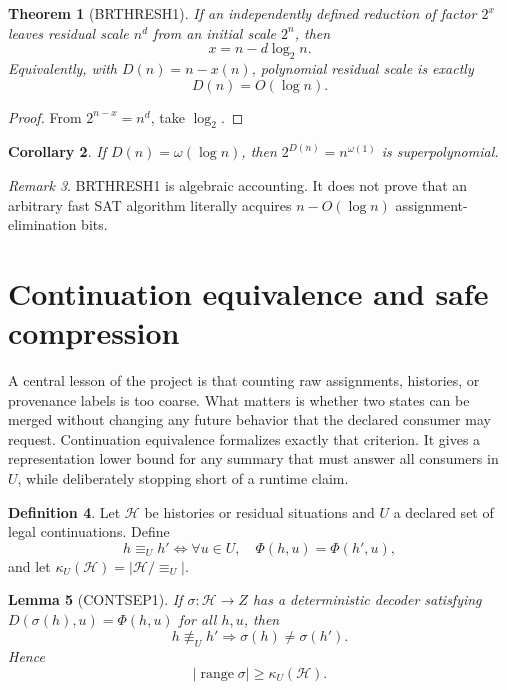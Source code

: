 \documentclass[11pt]{article}
\theoremstyle{plain}
\newtheorem{theorem}{Theorem}[section]
\newtheorem{lemma}[theorem]{Lemma}
\newtheorem{corollary}[theorem]{Corollary}
\theoremstyle{definition}
\newtheorem{definition}[theorem]{Definition}
\theoremstyle{remark}
\newtheorem{remark}[theorem]{Remark}
\begin{document}
\begin{theorem}[BRTHRESH1]
If an independently defined reduction of factor $2^x$ leaves residual scale
$n^d$ from an initial scale $2^n$, then
\[
\boxed{x=n-d\log_2 n.}
\]
Equivalently, with $D(n)=n-x(n)$, polynomial residual scale is exactly
\[
\boxed{D(n)=O(\log n).}
\]
\end{theorem}

\begin{proof}
From $2^{n-x}=n^d$, take $\log_2$.
\end{proof}

\begin{corollary}
If $D(n)=\omega(\log n)$, then $2^{D(n)}=n^{\omega(1)}$ is superpolynomial.
\end{corollary}

\begin{remark}
BRTHRESH1 is algebraic accounting. It does not prove that an arbitrary fast
SAT algorithm literally acquires $n-O(\log n)$ assignment-elimination bits.
\end{remark}

\section{Continuation equivalence and safe compression}

A central lesson of the project is that counting raw assignments, histories,
or provenance labels is too coarse. What matters is whether two states can be
merged without changing any future behavior that the declared consumer may
request. Continuation equivalence formalizes exactly that criterion. It gives
a representation lower bound for any summary that must answer all consumers
in $U$, while deliberately stopping short of a runtime claim.

\begin{definition}
Let $\mathcal H$ be histories or residual situations and $U$ a declared set of
legal continuations. Define
\[
h\equiv_U h'
\iff
\forall u\in U,\quad \Phi(h,u)=\Phi(h',u),
\]
and let $\kappa_U(\mathcal H)=|\mathcal H/\!\equiv_U|$.
\end{definition}

\begin{lemma}[CONTSEP1]
If $\sigma:\mathcal H\to Z$ has a deterministic decoder satisfying
$D(\sigma(h),u)=\Phi(h,u)$ for all $h,u$, then
\[
h\not\equiv_U h'\Longrightarrow \sigma(h)\ne\sigma(h').
\]
Hence
\[
\boxed{|\operatorname{range}\sigma|\ge\kappa_U(\mathcal H).}
\]
\end{lemma}
\end{document}
